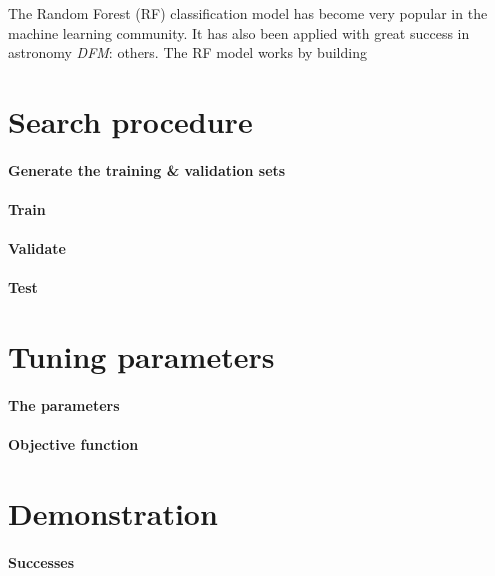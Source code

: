 \documentclass[12pt,preprint]{aastex}
\newcommand{\sectlabel}[1]{\label{sect:#1}}
\newcommand{\todo}[3]{{\color{#2}\emph{#1}: #3}}
\newcommand{\dfmtodo}[1]{\todo{DFM}{red}{#1}}
\begin{document}
The Random Forest (RF) classification model \citep{Breiman:2001} has become
very popular in the machine learning community.
It has also been applied with great success in astronomy \citep[for
example]{Richards:2011, Richards:2012} \dfmtodo{others}.
The RF model works by building




\section{Search procedure}\sectlabel{search}

\paragraph{Generate the training \& validation sets}

\paragraph{Train}

\paragraph{Validate}

\paragraph{Test}


\section{Tuning parameters}

\paragraph{The parameters}

\paragraph{Objective function}


\section{Demonstration}

\paragraph{Successes}
\end{document}
